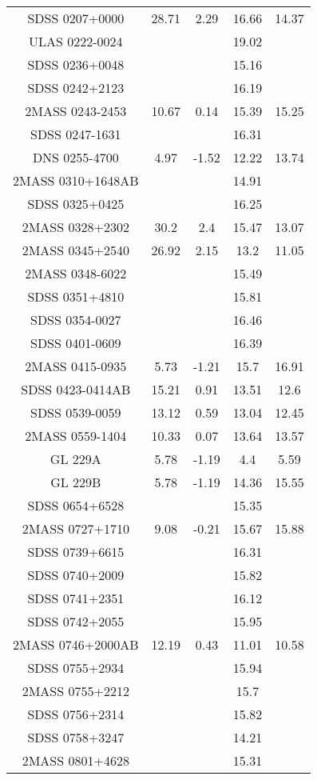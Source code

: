 \begin{table}
\begin{tabular}{ccccc}
SDSS 0207+0000 & 28.71 & 2.29 & 16.66 & 14.37 \\
ULAS 0222-0024 &  &  & 19.02 &  \\
SDSS 0236+0048 &  &  & 15.16 &  \\
SDSS 0242+2123 &  &  & 16.19 &  \\
2MASS 0243-2453 & 10.67 & 0.14 & 15.39 & 15.25 \\
SDSS 0247-1631 &  &  & 16.31 &  \\
DNS 0255-4700 & 4.97 & -1.52 & 12.22 & 13.74 \\
2MASS 0310+1648AB &  &  & 14.91 &  \\
SDSS 0325+0425 &  &  & 16.25 &  \\
2MASS 0328+2302 & 30.2 & 2.4 & 15.47 & 13.07 \\
2MASS 0345+2540 & 26.92 & 2.15 & 13.2 & 11.05 \\
2MASS 0348-6022 &  &  & 15.49 &  \\
SDSS 0351+4810 &  &  & 15.81 &  \\
SDSS 0354-0027 &  &  & 16.46 &  \\
SDSS 0401-0609 &  &  & 16.39 &  \\
2MASS 0415-0935 & 5.73 & -1.21 & 15.7 & 16.91 \\
SDSS 0423-0414AB & 15.21 & 0.91 & 13.51 & 12.6 \\
SDSS 0539-0059 & 13.12 & 0.59 & 13.04 & 12.45 \\
2MASS 0559-1404 & 10.33 & 0.07 & 13.64 & 13.57 \\
GL 229A & 5.78 & -1.19 & 4.4 & 5.59 \\
GL 229B & 5.78 & -1.19 & 14.36 & 15.55 \\
SDSS 0654+6528 &  &  & 15.35 &  \\
2MASS 0727+1710 & 9.08 & -0.21 & 15.67 & 15.88 \\
SDSS 0739+6615 &  &  & 16.31 &  \\
SDSS 0740+2009 &  &  & 15.82 &  \\
SDSS 0741+2351 &  &  & 16.12 &  \\
SDSS 0742+2055 &  &  & 15.95 &  \\
2MASS 0746+2000AB & 12.19 & 0.43 & 11.01 & 10.58 \\
SDSS 0755+2934 &  &  & 15.94 &  \\
2MASS 0755+2212 &  &  & 15.7 &  \\
SDSS 0756+2314 &  &  & 15.82 &  \\
SDSS 0758+3247 &  &  & 14.21 &  \\
2MASS 0801+4628 &  &  & 15.31 &  \\

\end{tabular}
\end{table}
